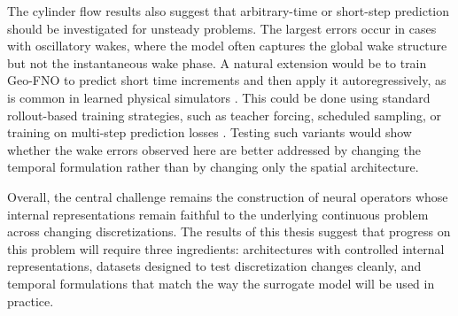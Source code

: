 The cylinder flow results also suggest that arbitrary-time or short-step prediction should be investigated for unsteady problems. The largest errors occur in cases with oscillatory wakes, where the model often captures the global wake structure but not the instantaneous wake phase. A natural extension would be to train Geo-FNO to predict short time increments and then apply it autoregressively, as is common in learned physical simulators \cite{pfaff-datasets}. This could be done using standard rollout-based training strategies, such as teacher forcing, scheduled sampling, or training on multi-step prediction losses \cite{recurrent-neural-operators}. Testing such variants would show whether the wake errors observed here are better addressed by changing the temporal formulation rather than by changing only the spatial architecture.

Overall, the central challenge remains the construction of neural operators whose internal representations remain faithful to the underlying continuous problem across changing discretizations. The results of this thesis suggest that progress on this problem will require three ingredients: architectures with controlled internal representations, datasets designed to test discretization changes cleanly, and temporal formulations that match the way the surrogate model will be used in practice.